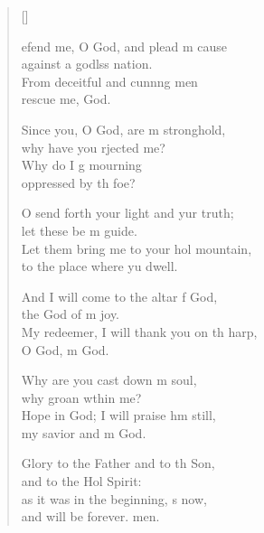 \settowidth{\versewidth}{My redeemer, I will thank you on the harp, *}
\begin{verse}[\versewidth]
  \begin{patverse}
    efend me, O God, and plead m cause\Med\\
against a godlss nation.\\
From deceitful and cunn\pointup{\i}ng men\Med\\
rescue me,  God.

Since you, O God, are m stronghold,\Med\\
why have you rjected me?\\
Why do I g mourning\Med\\
oppressed by th foe?

O send forth your light and yur truth;\Med\\
let these be m guide.\\
Let them bring me to your hol mountain,\Med\\
to the place where yu dwell.

And I will come to the altar f God,\Med\\
the God of m joy.\\
My redeemer, I will thank you on th harp,\Med\\
O God, m God.

Why are you cast down m soul,\Med\\
why groan w\pointup{\i}thin me?\\
Hope in God; I will praise h\pointup{\i}m still,\Med\\
my savior and m God.

Glory to the Father and to th Son,\Med\\
and to the Hol Spirit:\\
as it was in the beginning, \pointup{\i}s now,\Med\\
and will be forever. men.
  \end{patverse}
\end{verse}
